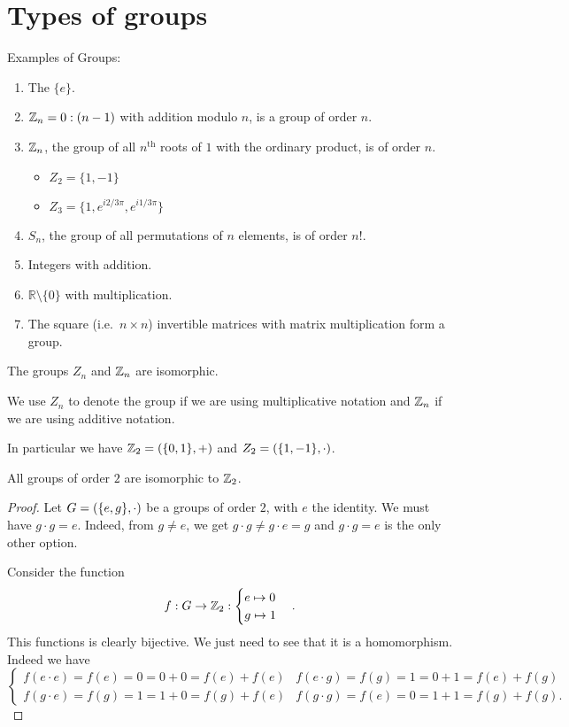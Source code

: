 \section{Types of groups}
\begin{example}
Examples of Groups:
\begin{enumerate}
\item The  $\{e\}$.
\item $\mathbb{Z}_n = 0:(n-1)$ with addition modulo $n$, is a group of order $n$.
\item $\mathbb{Z}_n$, the group of all $n^{\text{th}}$ roots of $1$ with the ordinary product, is of order $n$.
\begin{itemize}
\item $Z_2 = \{1,-1\}$
\item $Z_3 = \{1, e^{i2/3\pi}, e^{i1/3\pi}\}$
\end{itemize}
\item $S_n$, the group of all permutations of $n$ elements, is of order $n!$.
\item Integers with addition.
\item $\mathbb{R}\setminus\{0\}$ with multiplication.
\item The square (i.e.\ $n\times n$) invertible matrices with matrix multiplication form a group.
\end{enumerate}
\end{example}

\begin{proposition}
The groups $Z_n$ and $\mathbb{Z}_n$ are isomorphic.
\end{proposition}
We use $Z_n$ to denote the group if we are using multiplicative notation and $\mathbb{Z}_n$ if we are using additive notation.

In particular we have $\mathbb{Z}_2 = \left( \{0,1\},+ \right)$ and $Z_2 = \left( \{1,-1\},\cdot \right)$.

\begin{lemma}
All groups of order $2$ are isomorphic to $\mathbb{Z}_2$.
\end{lemma}
\begin{proof}
Let $G = \left( \{e,g\}, \cdot \right)$ be a groups of order $2$, with $e$ the identity.
We must have $g\cdot g = e$. Indeed, from $g \neq e$, we get $g\cdot g \neq g\cdot e = g$ and $g\cdot g = e$ is the only other option.

Consider the function
\[ f: G \to \mathbb{Z}_2: \begin{cases}
e\mapsto 0 \\ g \mapsto 1
\end{cases}. \]
This functions is clearly bijective. We just need to see that it is a homomorphism. Indeed we have
\[ \begin{cases}
f(e\cdot e) = f(e) = 0 = 0+0 = f(e) + f(e) & f(e\cdot g) = f(g) = 1 = 0+1 = f(e) + f(g) \\
f(g\cdot e) = f(g) = 1 = 1+0 = f(g) + f(e) & f(g\cdot g) = f(e) = 0 = 1+1 = f(g) + f(g). 
\end{cases} \] 
\end{proof}

